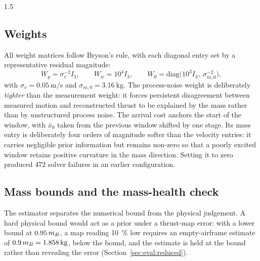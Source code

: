 \begin{spacing}{1.5}
\subsection{Weights}\label{sec:frame:weights}

All weight matrices follow Bryson's rule, with each diagonal entry set by a
representative residual magnitude:
\begin{equation}
W_y = \sigma_v^{-2} I_3,
\qquad
W_w = 10^{4} I_3,
\qquad
W_0 = \mathrm{diag}\bigl(10^{3} I_3,\ \sigma_{m,0}^{-2}\bigr),
\label{eq:Wred}
\end{equation}
with $\sigma_v=\SI{0.05}{\meter\per\second}$ and $\sigma_{m,0} = \SI{3.16}{\kg}$.
The process-noise weight is deliberately \emph{tighter} than the measurement
weight: it forces persistent disagreement between measured motion and
reconstructed thrust to be explained by the mass rather than by unstructured
process noise. The arrival cost anchors the start of the window, with $\bar x_0$
taken from the previous window shifted by one stage. Its mass entry is
deliberately four orders of magnitude softer than the velocity entries: it
carries negligible prior information but remains non-zero so that a poorly
excited window retains positive curvature in the mass direction. Setting it to
zero produced 472 solver failures in an earlier configuration.

\subsection{Mass bounds and the mass-health check}\label{sec:frame:health}

The estimator separates the numerical bound from the physical judgement. A hard
physical bound would act as a prior under a thrust-map error: with a lower bound
at $0.95\,m_B$, a map reading \SI{10}{\percent} low requires an empty-airframe
estimate of $0.9\,\mB=\SI{1.858}{\kg}$, below the bound, and the estimate is
held at the bound rather than revealing the error
(Section~\ref{sec:eval:reduced}).


\end{spacing}
